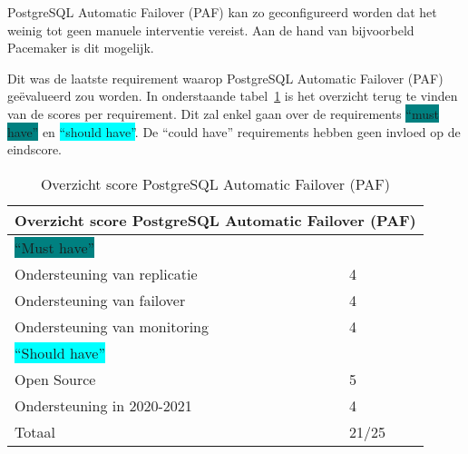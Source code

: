 PostgreSQL Automatic Failover (PAF) kan zo geconfigureerd worden dat het weinig tot geen manuele interventie vereist. Aan de hand van bijvoorbeld Pacemaker is dit mogelijk.

Dit was de laatste requirement waarop PostgreSQL Automatic Failover (PAF) geëvalueerd zou worden. In onderstaande tabel~\ref{table:Overzicht score PostgreSQL Automatic Failover (PAF)} is het overzicht terug te vinden van de scores per requirement. Dit zal enkel gaan over de requirements \colorbox{teal}{“must have”} en \colorbox{cyan}{“should have”}. De “could have” requirements hebben geen invloed op de eindscore.



\begin{table}[!h]
    \centering
    \begin{tabular}{ |p{6cm}||p{6cm}|  }
        \hline
        \multicolumn{2}{|c|}{Overzicht score PostgreSQL Automatic Failover (PAF)} \\
        \hline
        \colorbox{teal}{“Must have”} & \\
        \hline
        Ondersteuning van replicatie  & 4 \\
        Ondersteuning van failover &  4 \\
        Ondersteuning van monitoring & 4 \\
        \hline
        \colorbox{cyan}{“Should have”} & \\
        \hline
        Open Source &  5 \\
        Ondersteuning in 2020-2021 & 4 \\
        \hline
        \hline
        Totaal & 21/25 \\
        \hline    
    \end{tabular}
    \caption{Overzicht score PostgreSQL Automatic Failover (PAF)}
    \label{table:Overzicht score PostgreSQL Automatic Failover (PAF)}
\end{table}
